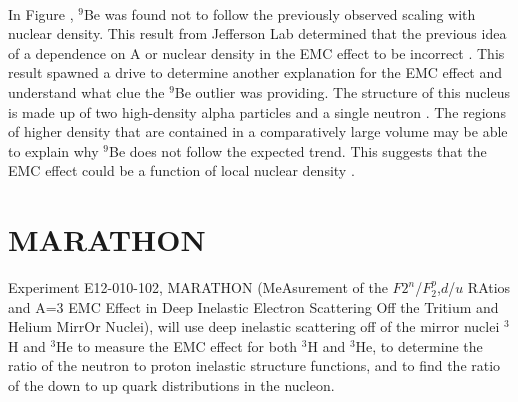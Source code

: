 \paragraph{} In Figure , $^9$Be was found not to follow the previously observed scaling with nuclear density. This result from Jefferson Lab determined that the previous idea of a dependence on A or nuclear density in the EMC effect to be incorrect \cite{seeley}. This result spawned a drive to determine another explanation for the EMC effect and understand what clue the $^9$Be outlier was providing. The structure of this nucleus is made up of two high-density alpha particles and a single neutron \cite{ajppt}. The regions of higher density that are contained in a comparatively large volume may be able to explain why $^9$Be does not follow the expected trend. This suggests that the EMC effect could be a function of local nuclear density \cite{seeley}. 




\section{MARATHON}
Experiment E12-010-102, MARATHON (MeAsurement of the $F2^n$/$F_2^p$,$d$/$u$ RAtios and A=3 EMC Effect in Deep Inelastic Electron Scattering Off the Tritium and Helium MirrOr Nuclei), will use deep inelastic scattering off of the mirror nuclei $^3$H and $^3$He to measure the EMC effect for both $^3$H and $^3$He, to determine the ratio of the neutron to proton inelastic structure functions, and to find the ratio of the down to up quark distributions in the nucleon.

